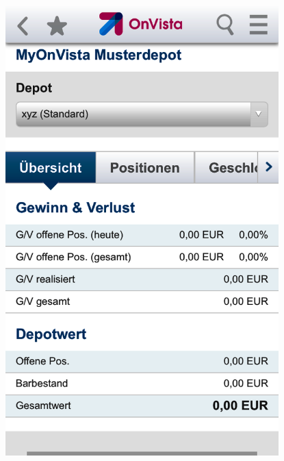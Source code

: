\begin{figure}[H] 
    \begin{minipage}[b]{.5\linewidth}
        \centering\includegraphics[width=0.94\textwidth]{img/screenshots/ex5p1.png}
    \end{minipage}%
    \begin{minipage}[b]{.5\linewidth}

\end{minipage}
\end{figure}
